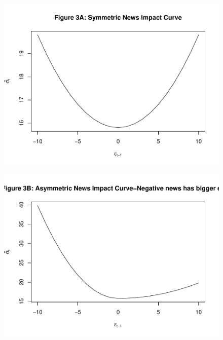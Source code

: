 \documentclass[]{book}
\theoremstyle{definition}
\theoremstyle{definition}
\theoremstyle{definition}
\theoremstyle{remark}
\begin{document}
\begin{figure}

{\centering \includegraphics[width=1\linewidth]{bookdown-demo_files/figure-latex/ch7-figure2-1} 

}

\end{figure}\begin{figure}

{\centering \includegraphics[width=1\linewidth]{bookdown-demo_files/figure-latex/ch7-figure2-2} 

}

\end{figure}\begin{figure}


\end{figure}
\end{document}
